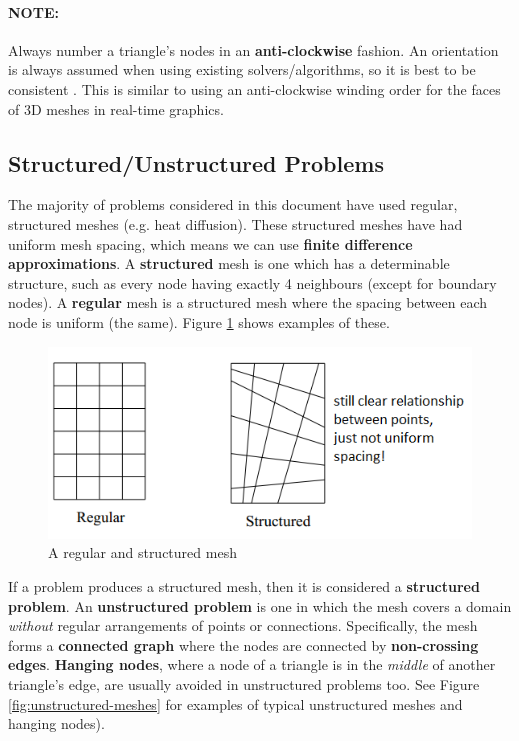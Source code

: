 \documentclass{article}
\begin{document}
\paragraph{\textbf{NOTE:}} Always number a triangle's nodes in an \textbf{anti-clockwise} fashion. An orientation is always assumed when using existing solvers/algorithms, so it is best to be consistent . This is similar to using an anti-clockwise winding order for the faces of 3D meshes in real-time graphics.

\subsection{Structured/Unstructured Problems}
\label{sec:structured-unstructured-problems}

The majority of problems considered in this document have used regular, structured meshes (e.g. heat diffusion). These structured meshes have had uniform mesh spacing, which means we can use \textbf{finite difference approximations}. A \textbf{structured} mesh is one which has a determinable structure, such as every node having exactly 4 neighbours (except for boundary nodes). A \textbf{regular} mesh is a structured mesh where the spacing between each node is uniform (the same). Figure \ref{fig:regular-structured-meshes} shows examples of these.

\begin{figure}
	\centering
	\includegraphics[scale=0.6]{figures/regular-structured-mesh.png}
	\caption{A regular and structured mesh}
	\label{fig:regular-structured-meshes}
\end{figure}

If a problem produces a structured mesh, then it is considered a \textbf{structured problem}. An \textbf{unstructured problem} is one in which the mesh covers a domain \textit{without} regular arrangements of points or connections. Specifically, the mesh forms a \textbf{connected graph} where the nodes are connected by \textbf{non-crossing edges}. \textbf{Hanging nodes}, where a node of a triangle is in the \textit{middle} of another triangle's edge, are usually avoided in unstructured problems too. See Figure \ref{fig:unstructured-meshes} for examples of typical unstructured meshes and hanging nodes).
\end{document}
